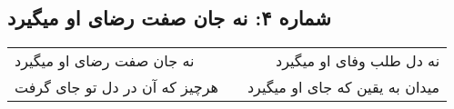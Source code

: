 \begin{center}
\section*{شماره ۴: نه جان صفت رضای او میگیرد}
\label{sec:004}
\begin{longtable}{l p{0.5cm} r}
نه جان صفت رضای او میگیرد
&&
نه دل طلب وفای او میگیرد
\\
هرچیز که آن در دل تو جای گرفت
&&
میدان به یقین که جای او میگیرد
\\
\end{longtable}
\end{center}
